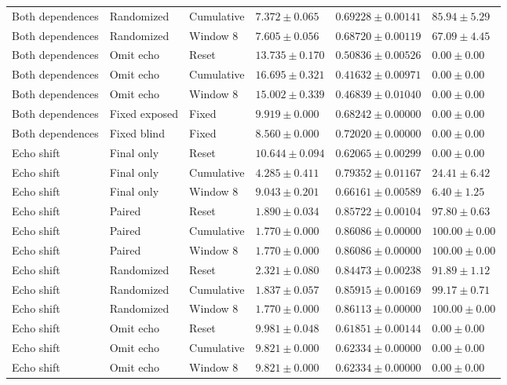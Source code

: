 \begin{longtable}{@{}llllll@{}}
Both dependences & Randomized & Cumulative & $7.372 \pm 0.065$ & $0.69228 \pm 0.00141$ & $85.94 \pm 5.29$ \\
Both dependences & Randomized & Window 8 & $7.605 \pm 0.056$ & $0.68720 \pm 0.00119$ & $67.09 \pm 4.45$ \\
Both dependences & Omit echo & Reset & $13.735 \pm 0.170$ & $0.50836 \pm 0.00526$ & $0.00 \pm 0.00$ \\
Both dependences & Omit echo & Cumulative & $16.695 \pm 0.321$ & $0.41632 \pm 0.00971$ & $0.00 \pm 0.00$ \\
Both dependences & Omit echo & Window 8 & $15.002 \pm 0.339$ & $0.46839 \pm 0.01040$ & $0.00 \pm 0.00$ \\
Both dependences & Fixed exposed & Fixed & $9.919 \pm 0.000$ & $0.68242 \pm 0.00000$ & $0.00 \pm 0.00$ \\
Both dependences & Fixed blind & Fixed & $8.560 \pm 0.000$ & $0.72020 \pm 0.00000$ & $0.00 \pm 0.00$ \\
Echo shift & Final only & Reset & $10.644 \pm 0.094$ & $0.62065 \pm 0.00299$ & $0.00 \pm 0.00$ \\
Echo shift & Final only & Cumulative & $4.285 \pm 0.411$ & $0.79352 \pm 0.01167$ & $24.41 \pm 6.42$ \\
Echo shift & Final only & Window 8 & $9.043 \pm 0.201$ & $0.66161 \pm 0.00589$ & $6.40 \pm 1.25$ \\
Echo shift & Paired & Reset & $1.890 \pm 0.034$ & $0.85722 \pm 0.00104$ & $97.80 \pm 0.63$ \\
Echo shift & Paired & Cumulative & $1.770 \pm 0.000$ & $0.86086 \pm 0.00000$ & $100.00 \pm 0.00$ \\
Echo shift & Paired & Window 8 & $1.770 \pm 0.000$ & $0.86086 \pm 0.00000$ & $100.00 \pm 0.00$ \\
Echo shift & Randomized & Reset & $2.321 \pm 0.080$ & $0.84473 \pm 0.00238$ & $91.89 \pm 1.12$ \\
Echo shift & Randomized & Cumulative & $1.837 \pm 0.057$ & $0.85915 \pm 0.00169$ & $99.17 \pm 0.71$ \\
Echo shift & Randomized & Window 8 & $1.770 \pm 0.000$ & $0.86113 \pm 0.00000$ & $100.00 \pm 0.00$ \\
Echo shift & Omit echo & Reset & $9.981 \pm 0.048$ & $0.61851 \pm 0.00144$ & $0.00 \pm 0.00$ \\
Echo shift & Omit echo & Cumulative & $9.821 \pm 0.000$ & $0.62334 \pm 0.00000$ & $0.00 \pm 0.00$ \\
Echo shift & Omit echo & Window 8 & $9.821 \pm 0.000$ & $0.62334 \pm 0.00000$ & $0.00 \pm 0.00$ \\

\end{longtable}
